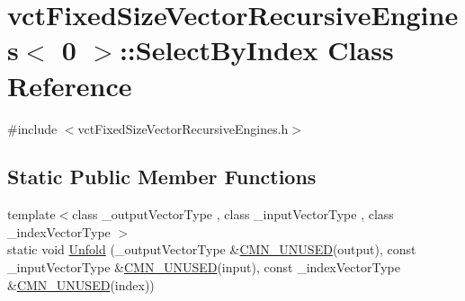 \hypertarget{classvct_fixed_size_vector_recursive_engines_3_010_01_4_1_1_select_by_index}{\section{vct\-Fixed\-Size\-Vector\-Recursive\-Engines$<$ 0 $>$\-:\-:Select\-By\-Index Class Reference}
\label{classvct_fixed_size_vector_recursive_engines_3_010_01_4_1_1_select_by_index}
}


{\ttfamily \#include $<$vct\-Fixed\-Size\-Vector\-Recursive\-Engines.\-h$>$}

\subsection*{Static Public Member Functions}
\begin{DoxyCompactItemize}
\item 
{\footnotesize template$<$class \-\_\-output\-Vector\-Type , class \-\_\-input\-Vector\-Type , class \-\_\-index\-Vector\-Type $>$ }\\static void \hyperlink{classvct_fixed_size_vector_recursive_engines_3_010_01_4_1_1_select_by_index_af31a0a34314cd2395078f3fce335cdfa}{Unfold} (\-\_\-output\-Vector\-Type \&\hyperlink{cmn_portability_8h_a021894e2626935fa2305434b1e893ff6}{C\-M\-N\-\_\-\-U\-N\-U\-S\-E\-D}(output), const \-\_\-input\-Vector\-Type \&\hyperlink{cmn_portability_8h_a021894e2626935fa2305434b1e893ff6}{C\-M\-N\-\_\-\-U\-N\-U\-S\-E\-D}(input), const \-\_\-index\-Vector\-Type \&\hyperlink{cmn_portability_8h_a021894e2626935fa2305434b1e893ff6}{C\-M\-N\-\_\-\-U\-N\-U\-S\-E\-D}(index))
\end{DoxyCompactItemize}


